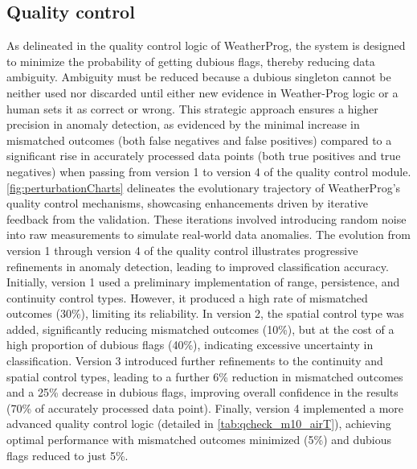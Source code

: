\documentclass[authoryear,preprint,review,12pt]{elsarticle}
\newcommand{\statusblock}[3]{
    \ifthenelse{\equal{#2}{todo}}
        {\textcolor{red}{#1 (TO DO): #3}}
        {}
    \ifthenelse{\equal{#2}{wip}}
        {\textcolor{magenta}{#1 (IN PROGRESS): #3}}
        {}
    \ifthenelse{\equal{#2}{update}}
        {\textcolor{blue}{#1 (UPDATE): #3}}
        {}
    \ifthenelse{\equal{#2}{review}}
        {\textcolor{cyan}{#1 (REVIEW): #3}}
        {}
    \ifthenelse{\equal{#2}{done}}
        {\textcolor{PineGreen}{#1 (READY): #3}}
        {}
}
\begin{document}
\subsection{Quality control}
As delineated in the quality control logic of WeatherProg, %
the system is designed to minimize the probability of getting dubious flags, thereby reducing data ambiguity.
Ambiguity must be reduced because a dubious singleton cannot be neither used nor discarded until either new evidence in Weather-Prog logic or a human sets it as correct or wrong.
This strategic approach ensures a higher precision in anomaly detection, as evidenced by the minimal increase in mismatched outcomes (both false negatives and false positives) compared to a significant rise in accurately processed data points (both true positives and true negatives) when passing from version 1 to version 4 of the quality control module.
\cref{fig:perturbationCharts} delineates the evolutionary trajectory of WeatherProg's quality control mechanisms, showcasing enhancements driven by iterative feedback from the validation. 
These iterations involved introducing random noise into raw measurements to simulate real-world data anomalies. 
The evolution from version 1 through version 4 of the quality control illustrates progressive refinements in anomaly detection, leading to improved classification accuracy. %
Initially, version 1 used a preliminary implementation of range, persistence, and continuity control types. 
However, it produced a high rate of mismatched outcomes (30\%), limiting its reliability.
In version 2, the spatial control type was added, significantly reducing mismatched outcomes (10\%), but at the cost of a high proportion of dubious flags (40\%), indicating excessive uncertainty in classification.
Version 3 introduced further refinements to the continuity and spatial control types, leading to a further 6\% reduction in mismatched outcomes and a 25\% decrease in dubious flags, improving overall confidence in the results (70\% of accurately processed data point).
Finally, version 4 implemented a more advanced quality control logic (detailed in \cref{tab:qcheck_m10_airT}), achieving optimal performance with mismatched outcomes minimized (5\%) and dubious flags reduced to just 5\%.
\end{document}
